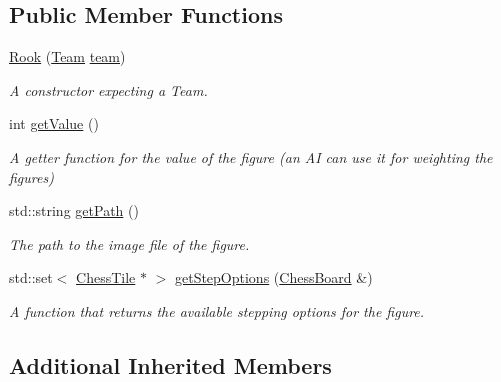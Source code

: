 \subsection*{Public Member Functions}
\begin{DoxyCompactItemize}
\item 
\mbox{\label{classRook_abdf50f6076fa9c5fed408815b91a6e82}} 
\mbox{\hyperlink{classRook_abdf50f6076fa9c5fed408815b91a6e82}{Rook}} (\mbox{\hyperlink{classChessFigure_a62f54318c1f28a08e6a6a2707f697a1d}{Team}} \mbox{\hyperlink{classChessFigure_ac7d0751a28c94d49927b9524390d1261}{team}})
\begin{DoxyCompactList}\small\item\em A constructor expecting a Team. \end{DoxyCompactList}\item 
\mbox{\label{classRook_ab3487b23185bb20b2b5306f9a5fe127b}} 
int \mbox{\hyperlink{classRook_ab3487b23185bb20b2b5306f9a5fe127b}{get\+Value}} ()
\begin{DoxyCompactList}\small\item\em A getter function for the value of the figure (an AI can use it for weighting the figures) \end{DoxyCompactList}\item 
\mbox{\label{classRook_a0cae7fbabe3169ec506fcd29ae396ba7}} 
std\+::string \mbox{\hyperlink{classRook_a0cae7fbabe3169ec506fcd29ae396ba7}{get\+Path}} ()
\begin{DoxyCompactList}\small\item\em The path to the image file of the figure. \end{DoxyCompactList}\item 
std\+::set$<$ \mbox{\hyperlink{classChessTile}{Chess\+Tile}} $\ast$ $>$ \mbox{\hyperlink{classRook_a466f48269ca58857c2a1ab1ab92c91f8}{get\+Step\+Options}} (\mbox{\hyperlink{classChessBoard}{Chess\+Board}} \&)
\begin{DoxyCompactList}\small\item\em A function that returns the available stepping options for the figure. \end{DoxyCompactList}\end{DoxyCompactItemize}
\subsection*{Additional Inherited Members}


